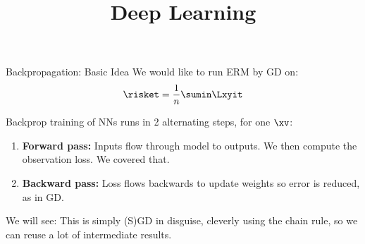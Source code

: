 




\newcommand{\titlefigure}{figure/backprop_gg_new.png}
\newcommand{\learninggoals}{
  \item Forward and backward passes
  \item Chain rule
  \item Details of backprop
}

\title{Deep Learning}
\date{}




\begin{frame}{Backpropagation: Basic Idea}
We would like to run ERM by GD on: $$ \risket = \frac{1}{n} \sumin \Lxyit$$ 

Backprop training of NNs runs in 2 alternating steps, for one $\xv$:
\begin{enumerate}
\item \textbf{Forward pass:} Inputs flow through model to outputs. 
    We then compute the observation loss. We covered that.
\item \textbf{Backward pass:} Loss flows backwards to update weights so error is reduced,
    as in GD.
\end{enumerate}
\lz
We will see: This is simply (S)GD in disguise, cleverly using the chain rule, so we can reuse
a lot of intermediate results.
\end{frame}



